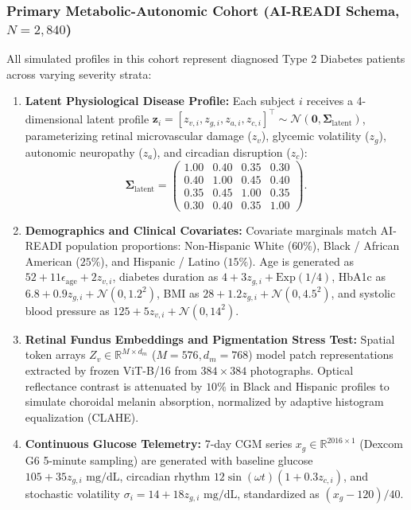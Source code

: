 \documentclass[journal,10pt,twocolumn]{IEEEtran}
\begin{document}
\subsubsection{Primary Metabolic-Autonomic Cohort (AI-READI Schema, \texorpdfstring{$N=2{,}840$}{N=2840})}
All simulated profiles in this cohort represent diagnosed Type 2 Diabetes patients across varying severity strata:
\begin{enumerate}
    \item \textbf{Latent Physiological Disease Profile:} Each subject $i$ receives a 4-dimensional latent profile $\mathbf{z}_i = [z_{v, i}, z_{g, i}, z_{a, i}, z_{c, i}]^\top \sim \mathcal{N}(\mathbf{0}, \boldsymbol{\Sigma}_{\text{latent}})$, parameterizing retinal microvascular damage ($z_v$), glycemic volatility ($z_g$), autonomic neuropathy ($z_a$), and circadian disruption ($z_c$):
    \begin{equation}
        \boldsymbol{\Sigma}_{\text{latent}} = \begin{pmatrix} 1.00 & 0.40 & 0.35 & 0.30 \\ 0.40 & 1.00 & 0.45 & 0.40 \\ 0.35 & 0.45 & 1.00 & 0.35 \\ 0.30 & 0.40 & 0.35 & 1.00 \end{pmatrix}.
    \end{equation}
    \item \textbf{Demographics and Clinical Covariates:} Covariate marginals match AI-READI population proportions: Non-Hispanic White ($60\%$), Black / African American ($25\%$), and Hispanic / Latino ($15\%$). Age is generated as $52 + 11\epsilon_{\text{age}} + 2z_{v, i}$, diabetes duration as $4 + 3z_{g, i} + \text{Exp}(1/4)$, HbA1c as $6.8 + 0.9z_{g, i} + \mathcal{N}(0, 1.2^2)$, BMI as $28 + 1.2z_{g, i} + \mathcal{N}(0, 4.5^2)$, and systolic blood pressure as $125 + 5z_{v, i} + \mathcal{N}(0, 14^2)$.
    \item \textbf{Retinal Fundus Embeddings and Pigmentation Stress Test:} Spatial token arrays $Z_v \in \mathbb{R}^{M \times d_m}$ ($M=576, d_m=768$) model patch representations extracted by frozen ViT-B/16 from $384 \times 384$ photographs. Optical reflectance contrast is attenuated by $10\%$ in Black and Hispanic profiles to simulate choroidal melanin absorption, normalized by adaptive histogram equalization (CLAHE).
    \item \textbf{Continuous Glucose Telemetry:} 7-day CGM series $x_g \in \mathbb{R}^{2016 \times 1}$ (Dexcom G6 5-minute sampling) are generated with baseline glucose $105 + 35z_{g, i}\text{ mg/dL}$, circadian rhythm $12\sin(\omega t)(1 + 0.3z_{c, i})$, and stochastic volatility $\sigma_i = 14 + 18z_{g, i}\text{ mg/dL}$, standardized as $(x_g - 120)/40$.

\end{enumerate}
\end{document}
